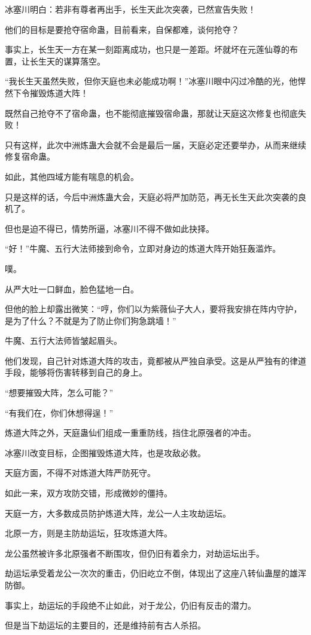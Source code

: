 \begin{this_body}
冰塞川明白：若非有尊者再出手，长生天此次突袭，已然宣告失败！

他们的目标是要抢夺宿命蛊，目前看来，自保都难，谈何抢夺？

事实上，长生天一方在某一刻距离成功，也只是一差距。坏就坏在元莲仙尊的布置，让长生天的谋算落空。

“我长生天虽然失败，但你天庭也未必能成功啊！”冰塞川眼中闪过冷酷的光，他悍然下令摧毁炼道大阵！

既然自己抢夺不了宿命蛊，也不能彻底摧毁宿命蛊，那就让天庭这次修复也彻底失败！

只有这样，此次中洲炼蛊大会就不会是最后一届，天庭必定还要举办，从而来继续修复宿命蛊。

如此，其他四域方能有喘息的机会。

只是这样的话，今后中洲炼蛊大会，天庭必将严加防范，再无长生天此次突袭的良机了。

但也是迫不得已，情势所逼，冰塞川不得不做如此抉择。

“好！”牛魔、五行大法师接到命令，立即对身边的炼道大阵开始狂轰滥炸。

噗。

从严大吐一口鲜血，脸色猛地一白。

但他的脸上却露出微笑：“哼，你们以为紫薇仙子大人，要将我安排在阵内守护，是为了什么？不就是为了防止你们狗急跳墙！”

牛魔、五行大法师皆皱起眉头。

他们发现，自己针对炼道大阵的攻击，竟都被从严独自承受。这是从严独有的律道手段，能够将伤害转移到自己的身上。

“想要摧毁大阵，怎么可能？”

“有我们在，你们休想得逞！”

炼道大阵之外，天庭蛊仙们组成一重重防线，挡住北原强者的冲击。

冰塞川改变目标，企图摧毁炼道大阵，也是攻敌必救。

天庭方面，不得不对炼道大阵严防死守。

如此一来，双方攻防交错，形成微妙的僵持。

天庭一方，大多数成员防护炼道大阵，龙公一人主攻劫运坛。

北原一方，则是主防劫运坛，狂攻炼道大阵。

龙公虽然被许多北原强者不断围攻，但仍旧有着余力，对劫运坛出手。

劫运坛承受着龙公一次次的重击，仍旧屹立不倒，体现出了这座八转仙蛊屋的雄浑防御。

事实上，劫运坛的手段绝不止如此，对于龙公，仍旧有反击的潜力。

但是当下劫运坛的主要目的，还是维持前有古人杀招。


\end{this_body}
